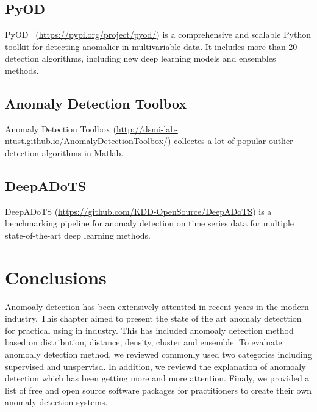 \subsection{PyOD}
PyOD~\cite{zhao2019pyod} (\href{https://pypi.org/project/pyod/}{https://pypi.org/project/pyod/})
is a comprehensive and scalable Python toolkit for
detecting anomalier in multivariable data.  
It includes more than 20 detection algorithms, 
including new deep learning models and ensembles methods.
\subsection{Anomaly Detection Toolbox}

Anomaly Detection Toolbox
(\href{http://dsmi-lab-ntust.github.io/AnomalyDetectionToolbox/}{http://dsmi-lab-ntust.github.io/AnomalyDetectionToolbox/})
collectes a lot of popular outlier detection algorithms in Matlab.

\subsection{DeepADoTS}

DeepADoTS (\href{https://github.com/KDD-OpenSource/DeepADoTS}{https://github.com/KDD-OpenSource/DeepADoTS})
is a benchmarking pipeline for anomaly detection on
time series data for
multiple state-of-the-art deep learning methods.


\section{Conclusions} \label{sec-conclusions}

Anomoaly detection has been extensively
attentted in recent years in the modern industry.
This chapter aimed to present the state of the art
anomaly detecttion for practical using in industry.
This has included anomoaly detection method based on distribution,
distance,
density,
cluster and ensemble.
To evaluate anomoaly detection method,
we reviewed commonly used
two categories including supervised and unspervisd.
In addition,
we reviewd the explanation of anomoaly detection which
has been getting more and more attention.
Finaly,
we provided a list of free and open source software packages for
practitioners to create their own anomaly detection systems.

